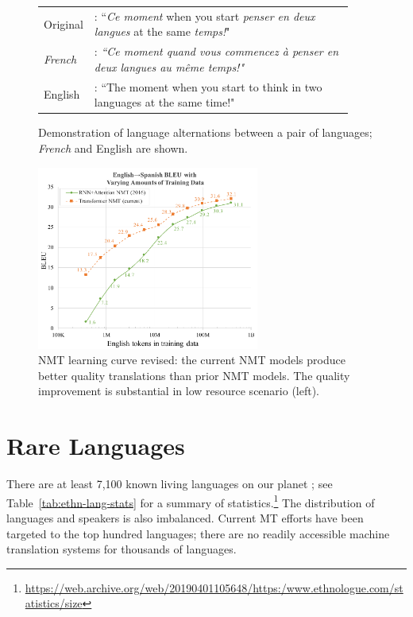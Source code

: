 \begin{figure}[ht]
    \centering
    \begin{tabular}{ p{0.07\linewidth}  p{0.85\linewidth}}
    \hline
    Original &: {``\textit{Ce moment} {when you start} \textit{penser en deux langues} {at the same} \textit{temps!}"} \\
    \textit{French} & : \textit{``Ce moment quand vous commencez à penser en deux langues au même temps!"}\\
    English & : ``The moment when you start to think in two languages at the same time!"\\
    \hline
    \end{tabular}
    \caption{Demonstration of language alternations between a pair of languages; \textit{French} and English are shown.}
    \label{fig:example-langswitch}
\end{figure}
\begin{figure}[htb]
    \centering
    \includegraphics[width=0.65\textwidth] {img/misc/learning-curve-min.pdf}
    \caption{NMT learning curve \cite{koehn2017sixchallenges} revised: the current NMT models produce better quality translations than prior NMT models. The quality improvement is substantial in low resource scenario (left).}
    \label{fig:nmt-learning-curve-min}
\end{figure}


\section*{Rare Languages}
There are at least 7,100 known living languages on our planet \cite{eberhard2019ethnologue}; see Table~\ref{tab:ethn-lang-stats} for a summary of statistics.\footnote{\url{https://web.archive.org/web/20190401105648/https:/www.ethnologue.com/statistics/size}}
The distribution of languages and speakers is also imbalanced. 
Current MT efforts have been targeted to the top hundred languages; there are no readily accessible machine translation systems for thousands of languages.

